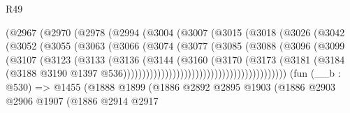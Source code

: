 \begin{lexlean}{R49}
\begin{coremodule}
                            (@2967
                              (@2970
                                (@2978
                                  (@2994
                                    (@3004
                                      (@3007
                                        (@3015
                                          (@3018
                                            (@3026
                                              (@3042
                                                (@3052
                                                  (@3055
                                                    (@3063
                                                      (@3066
                                                        (@3074
                                                          (@3077
                                                            (@3085
                                                              (@3088
                                                                (@3096
                                                                  (@3099
                                                                    (@3107
                                                                      (@3123
                                                                        (@3133
                                                                          (@3136
                                                                            (@3144
                                                                              (@3160
                                                                                (@3170
                                                                                  (@3173
                                                                                    (@3181
                                                                                      (@3184
                                                                                        (@3188
                                                                                          @3190
                                                                                          @1397
                                                                                          @536)))))))))))))))))))))))))))))))))))))))))))
    (fun (__b : @530) =>
    @1455
      (@1888
        @1899
        (@1886
          @2892
          @2895
          @1903
          (@1886
            @2903
            @2906
            @1907
            (@1886
              @2914
              @2917

\end{coremodule}
\end{lexlean}
